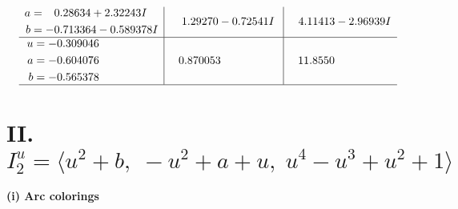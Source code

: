 \documentclass[1p]{elsarticle_modified}
\theoremstyle{definition}
\begin{document}
$$\begin{array}{c|c|c}
\begin{aligned}
a &= \phantom{-}0.28634 + 2.32243 I \\
b &= -0.713364 - 0.589378 I\end{aligned}
 & \phantom{-}1.29270 - 0.72541 I & \phantom{-}4.11413 - 2.96939 I \\ \hline\begin{aligned}
u &= -0.309046\phantom{ +0.000000I} \\
a &= -0.604076\phantom{ +0.000000I} \\
b &= -0.565378\phantom{ +0.000000I}\end{aligned}
 & \phantom{-}0.870053\phantom{ +0.000000I} & \phantom{-}11.8550\phantom{ +0.000000I}\\
 \hline 
 \end{array}$$\newpage\newpage\renewcommand{\arraystretch}{1}
\centering \section*{II. $I^u_{2}= \langle u^2+b,\;- u^2+a+u,\;u^4- u^3+u^2+1 \rangle$}
\flushleft \textbf{(i) Arc colorings}\\
\end{document}
